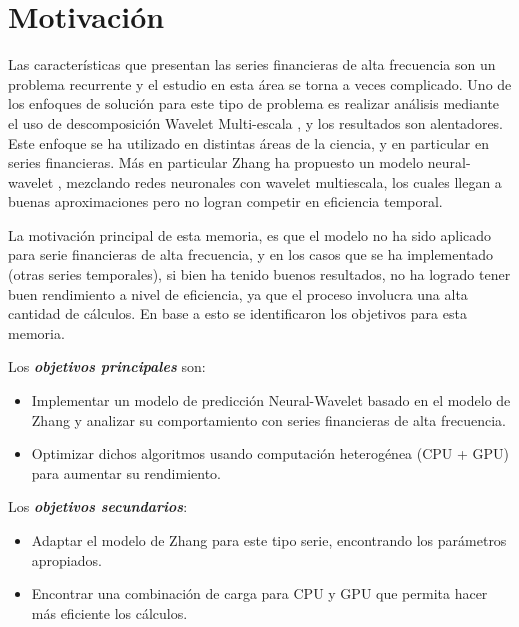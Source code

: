 \section{Motivación}

Las características que presentan las series financieras de alta frecuencia son un problema recurrente y el estudio en esta área se torna a veces complicado.
Uno de los enfoques de solución para este tipo de problema es realizar análisis mediante el uso de descomposición Wavelet Multi-escala \cite{benaouda2006wavelet}, y 
los resultados son alentadores. Este enfoque se ha utilizado en distintas áreas de la ciencia, y en particular en series financieras. Más en particular Zhang ha propuesto 
un modelo neural-wavelet \cite{zhang2001adaptive}, mezclando redes neuronales con wavelet multiescala, los cuales llegan a buenas aproximaciones pero no logran competir 
en eficiencia temporal. 

La motivación principal de esta memoria, es que el modelo no ha sido aplicado para serie financieras de alta frecuencia, y en los casos que se ha implementado (otras
series temporales), si bien ha tenido buenos resultados, no ha logrado tener buen rendimiento a nivel de eficiencia, ya que el proceso involucra una alta cantidad de cálculos. 
En base a esto se identificaron los objetivos para esta memoria.

Los \emph{\textbf{objetivos principales}} son:
\begin{itemize}
	\item Implementar un modelo de predicción Neural-Wavelet basado en el modelo de Zhang y analizar su comportamiento con series
		financieras de alta frecuencia.
	\item Optimizar dichos algoritmos usando computación heterogénea (CPU + GPU) para aumentar su rendimiento.
\end{itemize} 

Los \emph{\textbf{objetivos secundarios}}:
\begin{itemize}
	\item Adaptar el modelo de Zhang para este tipo serie, encontrando los parámetros apropiados.
	\item Encontrar una combinación de carga para CPU y GPU que permita hacer más eficiente los cálculos.
\end{itemize}

